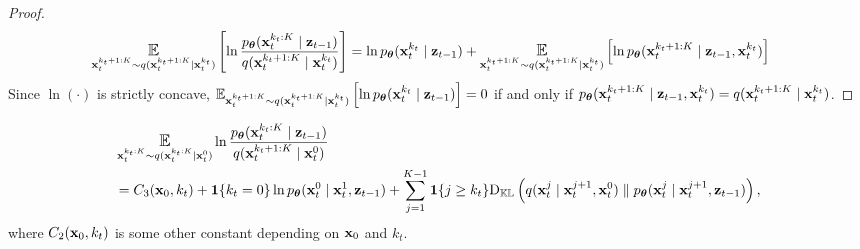 \begin{proof}
\begin{align*}
\Exp_{\bx_t^{k_t+1:K} \sim q(\bx_t^{k_t+1:K} \mid \bx_t^{k_t})}\left[  \ln\frac{\ptheta(\bx_{t}^{k_t:K} \mid \bz_{t-1})}{q(\bx_t^{k_t+1:K} \mid \bx_t^{k_t})}\right] &=   \ln \ptheta(\bx_{t}^{k_t} \mid \bz_{t-1}) + \Exp_{\bx_t^{k_t+1:K} \sim q(\bx_t^{k_t+1:K} \mid \bx_t^{k_t})}\left[  \ln \ptheta(\bx_{t}^{k_t+1:K} \mid \bz_{t-1}, \bx_t^{k_t})\right]
\end{align*}
Since $\ln(\cdot)$ is strictly concave, $\Exp_{\bx_t^{k_t+1:K} \sim q(\bx_t^{k_t+1:K} \mid \bx_t^{k_t})}\left[  \ln \ptheta(\bx_{t}^{k_t} \mid \bz_{t-1})\right] = 0$ if and only if $p_{\bm{\theta}}(\mathbf{x}_{t}^{k_t+1:K} \mid \mathbf{z}_{t-1}, \mathbf{x}_t^{k_t}) = q(\mathbf{x}_t^{k_t+1:K} \mid \mathbf{x}_t^{k_t})$. 
\end{proof}
\begin{claim}
\begin{align*}
&\Exp_{\bx_t^{k_t:K} \sim q(\bx_t^{k_t:K} \mid \bx_t^0)} \ln \frac{ \ptheta(\bx_{t}^{k_t:K} \mid \bz_{t-1})}{q(\bx_t^{k_t+1:K} \mid \bx^{0}_t)} \\
&=C_3(\bx_0,k_t) + \I\{k_t = 0\}\ln \ptheta(\bx_t^{0} \mid \bx_{t}^{1},  \bz_{t-1}) +  \sum_{j=1}^{K-1}\I\{j \ge k_t\}\Dkl\left(q(\bx_{t}^{j} \mid \bx_t^{j+1},\bx_t^0) \parallel \ptheta(\bx_{t}^{j} \mid \bx_{t}^{j+1}, \bz_{t-1})\right)\nonumber,
\end{align*}
where $C_2(\mathbf{x}_0,k_t)$ is some other constant depending on $\mathbf{x}_0$ and $k_t$.
\end{claim}
